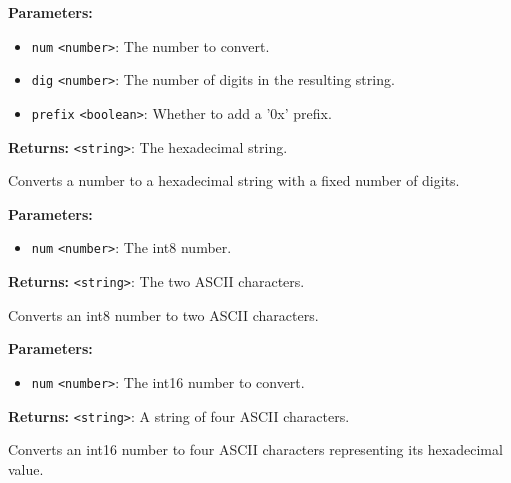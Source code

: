 \documentclass[12pt,a4paper]{article}
\begin{document}
\vspace{5mm}
\noindent {}


\noindent \textbf{Parameters:}
\begin{itemize}
  \item \texttt{num} \texttt{<number>}: The number to convert.
  \item \texttt{dig} \texttt{<number>}: The number of digits in the resulting string.
  \item \texttt{prefix} \texttt{<boolean>}: Whether to add a '0x' prefix.
\end{itemize}

\noindent \textbf{Returns:} \texttt{<string>}: The hexadecimal string.

\noindent Converts a number to a hexadecimal string with a fixed number of digits.

\vspace{5mm}
\noindent {}


\noindent \textbf{Parameters:}
\begin{itemize}
  \item \texttt{num} \texttt{<number>}: The int8 number.
\end{itemize}

\noindent \textbf{Returns:} \texttt{<string>}: The two ASCII characters.

\noindent Converts an int8 number to two ASCII characters.

\vspace{5mm}
\noindent {}


\noindent \textbf{Parameters:}
\begin{itemize}
  \item \texttt{num} \texttt{<number>}: The int16 number to convert.
\end{itemize}

\noindent \textbf{Returns:} \texttt{<string>}: A string of four ASCII characters.

\noindent Converts an int16 number to four ASCII characters representing its hexadecimal value.
\end{document}
